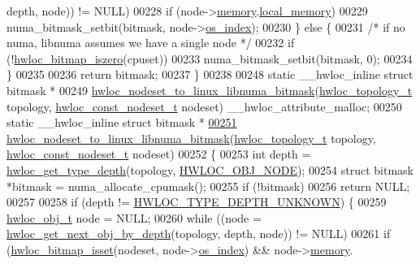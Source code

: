 \begin{DoxyCode}
      depth, node)) != NULL)
00228       \textcolor{keywordflow}{if} (node->\hyperlink{a00016_a1dc830816716213b5f797e4052487864}{memory}.\hyperlink{a00020_aace044c7f3fd9dffe50202296bf1dc5a}{local_memory})
00229         numa\_bitmask\_setbit(bitmask, node->\hyperlink{a00016_a61a7a80a68eaccbaaa28269e678c81a9}{os_index});
00230   \} \textcolor{keywordflow}{else} \{
00231     \textcolor{comment}{/* if no numa, libnuma assumes we have a single node */}
00232     \textcolor{keywordflow}{if} (!\hyperlink{a00065_gaa94fed35d2a598bc4a8657b6955b7bf5}{hwloc_bitmap_iszero}(cpuset))
00233       numa\_bitmask\_setbit(bitmask, 0);
00234   \}
00235 
00236   \textcolor{keywordflow}{return} bitmask;
00237 \}
00238 
00248 \textcolor{keyword}{static} \_\_hwloc\_inline \textcolor{keyword}{struct }bitmask *
00249 \hyperlink{a00069_gab67a395c48ddb56307b1465fab9bb9e6}{hwloc_nodeset_to_linux_libnuma_bitmask}(\hyperlink{a00039_ga9d1e76ee15a7dee158b786c30b6a6e38}{hwloc_topology_t} topology, 
      \hyperlink{a00040_ga2f5276235841ad66a79bedad16a5a10c}{hwloc_const_nodeset_t} nodeset) \_\_hwloc\_attribute\_malloc;
00250 \textcolor{keyword}{static} \_\_hwloc\_inline \textcolor{keyword}{struct }bitmask *
\hypertarget{a00034_source_l00251}{}\hyperlink{a00069_gab67a395c48ddb56307b1465fab9bb9e6}{00251} \hyperlink{a00069_gab67a395c48ddb56307b1465fab9bb9e6}{hwloc_nodeset_to_linux_libnuma_bitmask}(\hyperlink{a00039_ga9d1e76ee15a7dee158b786c30b6a6e38}{hwloc_topology_t} topology, 
      \hyperlink{a00040_ga2f5276235841ad66a79bedad16a5a10c}{hwloc_const_nodeset_t} nodeset)
00252 \{
00253   \textcolor{keywordtype}{int} depth = \hyperlink{a00046_gaea7c64dd59467f5201ba87712710b14d}{hwloc_get_type_depth}(topology, \hyperlink{a00041_ggacd37bb612667dc437d66bfb175a8dc55aaf0964881117bdedf1a5e9332cd120dd}{HWLOC_OBJ_NODE});
00254   \textcolor{keyword}{struct }bitmask *bitmask = numa\_allocate\_cpumask();
00255   \textcolor{keywordflow}{if} (!bitmask)
00256     \textcolor{keywordflow}{return} NULL;
00257 
00258   \textcolor{keywordflow}{if} (depth != \hyperlink{a00046_ggaf4e663cf42bbe20756b849c6293ef575a0565ab92ab72cb0cec91e23003294aad}{HWLOC_TYPE_DEPTH_UNKNOWN}) \{
00259     \hyperlink{a00016}{hwloc_obj_t} node = NULL;
00260     \textcolor{keywordflow}{while} ((node = \hyperlink{a00053_gab7c1dce3f42ece5bfa621e87cf332418}{hwloc_get_next_obj_by_depth}(topology, depth, node)) != NULL)
00261       \textcolor{keywordflow}{if} (\hyperlink{a00065_ga2583f44cbdb5fff2ea40efdcf3975d3f}{hwloc_bitmap_isset}(nodeset, node->\hyperlink{a00016_a61a7a80a68eaccbaaa28269e678c81a9}{os_index}) && node->\hyperlink{a00016_a1dc830816716213b5f797e4052487864}{memory}.

\end{DoxyCode}
